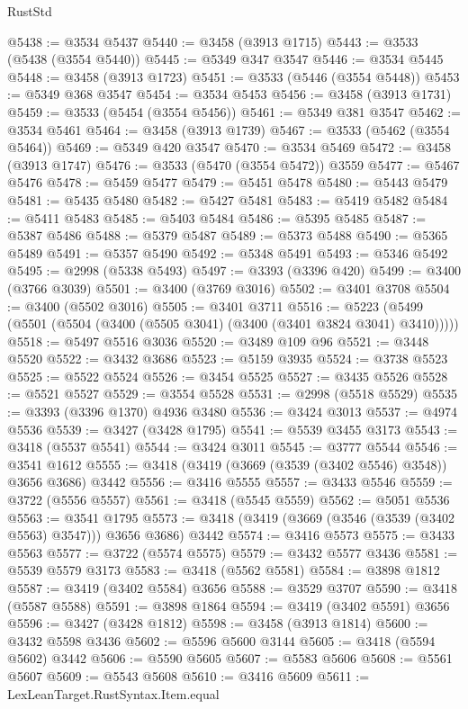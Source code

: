 \begin{lexlean}{RustStd}
\begin{coremodule}
@5438 := @3534 @5437
@5440 := @3458 (@3913 @1715)
@5443 := @3533 (@5438 (@3554 @5440))
@5445 := @5349 @347 @3547
@5446 := @3534 @5445
@5448 := @3458 (@3913 @1723)
@5451 := @3533 (@5446 (@3554 @5448))
@5453 := @5349 @368 @3547
@5454 := @3534 @5453
@5456 := @3458 (@3913 @1731)
@5459 := @3533 (@5454 (@3554 @5456))
@5461 := @5349 @381 @3547
@5462 := @3534 @5461
@5464 := @3458 (@3913 @1739)
@5467 := @3533 (@5462 (@3554 @5464))
@5469 := @5349 @420 @3547
@5470 := @3534 @5469
@5472 := @3458 (@3913 @1747)
@5476 := @3533 (@5470 (@3554 @5472)) @3559
@5477 := @5467 @5476
@5478 := @5459 @5477
@5479 := @5451 @5478
@5480 := @5443 @5479
@5481 := @5435 @5480
@5482 := @5427 @5481
@5483 := @5419 @5482
@5484 := @5411 @5483
@5485 := @5403 @5484
@5486 := @5395 @5485
@5487 := @5387 @5486
@5488 := @5379 @5487
@5489 := @5373 @5488
@5490 := @5365 @5489
@5491 := @5357 @5490
@5492 := @5348 @5491
@5493 := @5346 @5492
@5495 := @2998 (@5338 @5493)
@5497 := @3393 (@3396 @420)
@5499 := @3400 (@3766 @3039)
@5501 := @3400 (@3769 @3016)
@5502 := @3401 @3708
@5504 := @3400 (@5502 @3016)
@5505 := @3401 @3711
@5516 := @5223 (@5499 (@5501 (@5504 (@3400 (@5505 @3041) (@3400 (@3401 @3824 @3041) @3410)))))
@5518 := @5497 @5516 @3036
@5520 := @3489 @109 @96
@5521 := @3448 @5520
@5522 := @3432 @3686
@5523 := @5159 @3935
@5524 := @3738 @5523
@5525 := @5522 @5524
@5526 := @3454 @5525
@5527 := @3435 @5526
@5528 := @5521 @5527
@5529 := @3554 @5528
@5531 := @2998 (@5518 @5529)
@5535 := @3393 (@3396 @1370) @4936 @3480
@5536 := @3424 @3013
@5537 := @4974 @5536
@5539 := @3427 (@3428 @1795)
@5541 := @5539 @3455 @3173
@5543 := @3418 (@5537 @5541)
@5544 := @3424 @3011
@5545 := @3777 @5544
@5546 := @3541 @1612
@5555 := @3418 (@3419 (@3669 (@3539 (@3402 @5546) @3548)) @3656 @3686) @3442
@5556 := @3416 @5555
@5557 := @3433 @5546
@5559 := @3722 (@5556 @5557)
@5561 := @3418 (@5545 @5559)
@5562 := @5051 @5536
@5563 := @3541 @1795
@5573 := @3418 (@3419 (@3669 (@3546 (@3539 (@3402 @5563) @3547))) @3656 @3686) @3442
@5574 := @3416 @5573
@5575 := @3433 @5563
@5577 := @3722 (@5574 @5575)
@5579 := @3432 @5577 @3436
@5581 := @5539 @5579 @3173
@5583 := @3418 (@5562 @5581)
@5584 := @3898 @1812
@5587 := @3419 (@3402 @5584) @3656
@5588 := @3529 @3707
@5590 := @3418 (@5587 @5588)
@5591 := @3898 @1864
@5594 := @3419 (@3402 @5591) @3656
@5596 := @3427 (@3428 @1812)
@5598 := @3458 (@3913 @1814)
@5600 := @3432 @5598 @3436
@5602 := @5596 @5600 @3144
@5605 := @3418 (@5594 @5602) @3442
@5606 := @5590 @5605
@5607 := @5583 @5606
@5608 := @5561 @5607
@5609 := @5543 @5608
@5610 := @3416 @5609
@5611 := LexLeanTarget.RustSyntax.Item.equal

\end{coremodule}
\end{lexlean}
